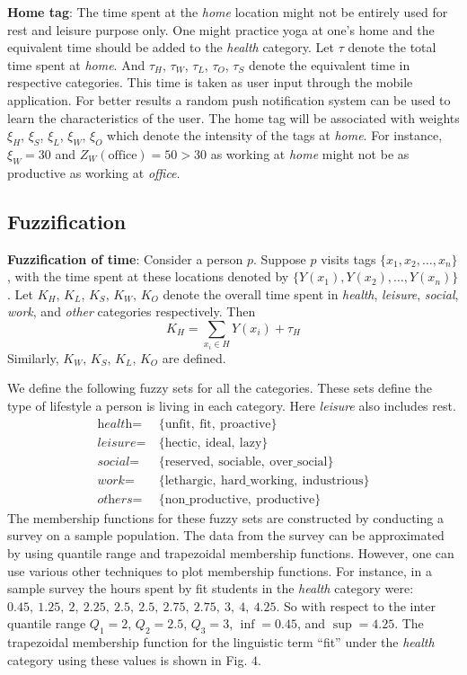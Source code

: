 \documentclass[conference]{IEEEtran}
\newcommand{\quotes}[1]{``#1''}
\begin{document}
\textbf{Home tag}: The time spent at the \textit{home} location might not be entirely used for rest and leisure purpose only. One might practice yoga at one\rq s home and the equivalent time should be added to the \textit{health} category. Let $\tau$ denote the total time spent at \textit{home}. And $\tau_H$, $\tau_W$, $\tau_L$, $\tau_O$, $\tau_S$ denote the equivalent time in respective categories. This time is taken as user input through the mobile application. For better results a random push notification system can be used to learn the characteristics of the user. The home tag will be associated with weights $\xi_H$, $\xi_S$, $\xi_L$, $\xi_W$, $\xi_O$ which denote the intensity of the tags at \textit{home}. For instance, $\xi_W=30$ and $Z_W(\text{office}) = 50 > 30$ as working at \textit{home} might not be as productive as working at \textit{office}.

\subsection{Fuzzification}

\textbf{Fuzzification of time}: Consider a person $p$. Suppose $p$ visits tags $\{x_1, x_2, \ldots, x_n\}$, with the time spent at these locations denoted by $\{Y(x_1), Y(x_2), \ldots, Y(x_n)\}$. Let $K_H$, $K_L$, $K_S$, $K_W$, $K_O$ denote the overall time spent in \textit{health}, \textit{leisure}, \textit{social}, \textit{work}, and \textit{other} categories respectively. Then 
\[
K_H = \sum_{x_i \in H}Y(x_i) + \tau_H
\]
Similarly, $K_W$, $K_S$, $K_L$, $K_O$ are defined.

We define the following fuzzy sets for all the categories. These sets define the type of lifestyle a person is living in each category. Here \textit{leisure} also includes rest.
\begin{align*}
\textit{health}=&\ \{\text{unfit},\ \text{fit},\ \text{proactive}\}\\
\textit{leisure}=&\ \{\text{hectic},\ \text{ideal},\ \text{lazy}\}\\
\textit{social}=&\ \{\text{reserved},\ \text{sociable},\ \text{over\_social}\}\\
\textit{work}=&\ \{\text{lethargic},\ \text{hard\_working},\ \text{industrious}\}\\
\textit{others}=&\ \{\text{non\_productive},\ \text{productive}\}
\end{align*}
The membership functions for these fuzzy sets are constructed by conducting a survey on a sample population. The data from the survey can be approximated by using quantile range and trapezoidal membership functions. However, one can use various other techniques to plot membership functions. For instance, in a sample survey the hours spent by fit students in the \textit{health} category were: $0.45,\ 1.25,\ 2,\ 2.25,\ 2.5,\ 2.5,\ 2.75,\ 2.75,\ 3,\ 4,\ 4.25$. So with respect to the inter quantile range $Q_1 = 2$, $Q_2 = 2.5$, $Q_3 = 3$, $\inf = 0.45$, and $\sup = 4.25$. The trapezoidal membership function for the linguistic term \quotes{fit} under the \textit{health} category using these values is shown in Fig. $4$.
\end{document}

